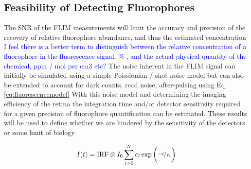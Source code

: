 \documentclass{optica-article}
\begin{document}
\subsection{Feasibility of Detecting Fluorophores}
\begin{outline}
    \1 The SNR of the FLIM measurements will limit the accuracy and precision of the recovery of relative fluorophore abundance, and thus the estimated concentration \textcolor{blue}{I feel there is a better term to distinguish between the relative concentration of a fluorophore in the fluorescence signal, \% , and the actual physical quantity of the chemical, ppm / mol per cm3 etc?}
    \1 The noise inherent in the FLIM signal can initially be simulated using a simple Poissionian / shot noise model but can also be extended to account for dark counts, read noise, after-pulsing using \cite{dutton2016single} Eq \ref{eq:fluorescencemodel} 
    \1 With this noise model and determining the imaging efficiency of the retina the integration time and/or detector sensitivity required for a given precision of fluorophore quantification can be estimated.
    \1 These results will be used to define whether we are hindered by the sensitivity of the detectors or some limit of biology. 

    

\end{outline}

\begin{equation}
I(t) = \text{IRF}\otimes I_{0}\sum_{i > 0}^{N}c_{i}\exp{\bigg (\nicefrac{-t}{\tau_{i}}} \bigg)
    \label{eq:fluorescencemodel}
\end{equation}
\end{document}
